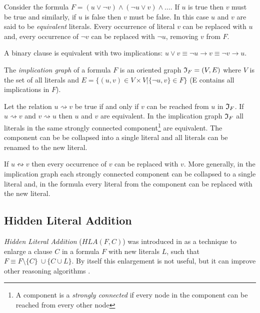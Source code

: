 Consider the formula $F = (u \lor \neg v) \land (\neg u \lor v) \land \ldots$.
If $u$ is true then $v$ must be true and similarly, if $u$ is false
then $v$ must be false. In this case $u$ and $v$ are said to be
\emph{equivalent} literals. Every occurrence of literal $v$ can be
replaced with $u$ and, every occurrence of $\neg v$ can be replaced
with $\neg u$, removing $v$ from $F$.

\begin{myprop}
  A binary clause is equivalent with two implications:
  $u \lor v \equiv \neg u \rightarrow v \equiv \neg v \rightarrow u$.
\end{myprop}

\begin{mydef}
  The \emph{implication graph} of a formula $F$ is an oriented graph
  $\mathfrak{I}_F = (V, E)$ where $V$ is the set of all literals and $E = \{(u,
  v) \in V \times V | \{\neg u, v\} \in F\}$ (E contains all implications in $F$).
\end{mydef}

Let the relation $u \rightsquigarrow v$ be true if and only if
$v$ can be reached from $u$ in $\mathfrak{I}_F$.  If $u \rightsquigarrow v$
and $v \rightsquigarrow u$ then $u$ and $v$ are equivalent.  In the
implication graph $\mathfrak{I}_F$ all literals in the same strongly connected
component\footnote{A component is a \emph{strongly connected}
if every node in the component can be reached from every other node}
are equivalent. The component can be be collapsed into a single
literal and all literals can be renamed to the new literal.

\begin{myprop}
  If $u \leftrightsquigarrow v$ then every occurrence of $v$ can be replaced
  with $v$. More generally, in the implication graph each strongly
  connected component can be collapsed to a single literal and, in
  the formula every literal from the component can be replaced with
  the new literal.
\end{myprop}


\subsection{Hidden Literal Addition}
\label{ssec:hla}

\emph{Hidden Literal Addition} ($HLA(F, C)$) was introduced in
\cite{Heule:2010:CEP:1928380.1928406} as a technique to enlarge a clause $C$
in a formula $F$ with new literals $L$, such that $F \equiv F \setminus \{C\} \
\cup \{ C \cup L \}$. By itself this enlargement is not useful, but it
can improve other reasoning algorithms \cite{Heule_coveredclause}.

